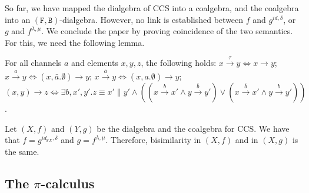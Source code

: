 \documentclass[orivec]{llncs}
\newcommand{\mF}[1]{\mathtt{#1}}
\newcommand{\F}{\mF{F}}
\newcommand{\B}{\mF{B}}
\newcommand{\id}{\mathit{id}}
\newcommand{\tr}[1]{\stackrel{#1}{\longrightarrow}}
\newcommand{\utr}{\to}
\begin{document}
\medskip

So far, we have mapped the dialgebra of CCS into a coalgebra, and the coalgebra into an $(\F,\B)$-dialgebra. However, no link is established between $f$ and $g^{\id,\delta}$, or $g$ and  $f^{\lambda,\mu}$. We conclude the paper by proving coincidence of the two semantics. For this, we need the following lemma. 

\begin{lemma}\label{lem:transition-reaction}
	For all channels $a$ and elements $x,y,z$, the following holds:
$x \tr \tau y \iff x \utr y$; 
$x \tr{a} y \iff (x,\bar a.\emptyset) \utr y$; 
$x \tr{\bar a} y \iff (x,a. \emptyset) \utr y$; 
$(x,y) \utr z \iff \exists b,x',y' . z \equiv x' \parallel y' \land 
( (x \tr{b} x' \land y \tr{\bar b} y') \lor		  
		(x \tr{\bar b} x' \land y \tr{b} y') )$. 
\end{lemma}

\begin{proposition}\label{pro:equal}
	Let $(X,f)$ and $(Y,g)$ be the dialgebra and the coalgebra for CCS. We have that $f = g^{id_{\F X}, \delta}$ and $g = f^{\lambda,\mu}$. Therefore, bisimilarity in $(X,f)$ and in $(X,g)$ is the same.
\end{proposition}


\subsection{The $\pi$-calculus}
\end{document}
